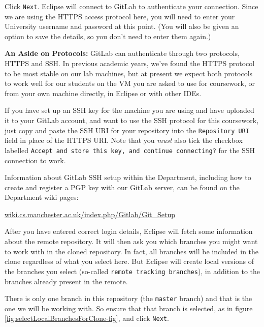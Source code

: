 \documentclass[
]{book}
\begin{document}
Click \texttt{Next}. Eclipse will connect to GitLab to authenticate your connection. Since we are using the HTTPS access protocol here, you will need to enter your University username and password at this point. (You will also be given an option to save the details, so you don't need to enter them again.)

\textbf{An Aside on Protocols:} GitLab can authenticate through two protocols, HTTPS and SSH. In previous academic years, we've found the HTTPS protocol to be most stable on our lab machines, but at present we expect both protocols to work well for our students on the VM you are asked to use for coursework, or from your own machine directly, in Eclipse or with other IDEs.

If you have set up an SSH key for the machine you are using and have uploaded it to your GitLab account, and want to use the SSH protocol for this coursework, just copy and paste the SSH URI for your repository into the \texttt{Repository\ URI} field in place of the HTTPS URI. Note that you \emph{must} also tick the checkbox labelled \texttt{Accept\ and\ store\ this\ key,\ and\ continue\ connecting?} for the SSH connection to work.

Information about GitLab SSH setup within the Department, including how to create and register a PGP key with our GitLab server, can be found on the Department wiki pages:

\href{https://wiki.cs.manchester.ac.uk/index.php/Gitlab/Git_Setup}{wiki.cs.manchester.ac.uk/index.php/Gitlab/Git\_Setup}

After you have entered correct login details, Eclipse will fetch some information about the remote repository. It will then ask you which branches you might want to work with in the cloned repository. In fact, all branches will be included in the clone regardless of what you select here. But Eclipse will create local versions of the branches you select (so-called \texttt{remote\ tracking\ branches}), in addition to the branches already present in the remote.

There is only one branch in this repository (the \texttt{master} branch) and that is the one we will be working with. So ensure that that branch is selected, as in figure \ref{fig:selectLocalBranchesForClone-fig}, and click \texttt{Next}.
\end{document}
